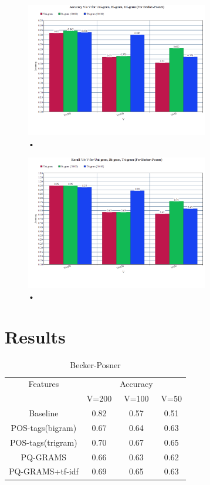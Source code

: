 \documentclass[letterpaper]{article}
\begin{document}
\begin{figure}[H]
\caption{•}
\includegraphics[width=8cm]{4.png}
\end{figure}
\begin{figure}[H]
\caption{•}
\includegraphics[width=8cm]{1.png}
\end{figure}
\section{Results}
\begin {table}[H]
\caption {Becker-Posner} \label{tab:title} 
\begin{center}
 \begin{tabular}{||c c c c||}
 \hline
 Features & & Accuracy \\ [0.5ex]
     & V=200 & V=100 & V=50\\ 
 \hline\hline
 Baseline & 0.82 & 0.57 & 0.51\\ 
 \hline
 POS-tags(bigram) & 0.67 & 0.64 & 0.63\\
 \hline
 POS-tags(trigram) & 0.70 & 0.67 & 0.65\\
 \hline
 PQ-GRAMS & 0.66 & 0.63 & 0.62\\
 \hline
 PQ-GRAMS+tf-idf & 0.69 & 0.65 & 0.63\\ [1ex] 
 \hline
\end{tabular}
\end{center}
\end{table}
\end{document}
